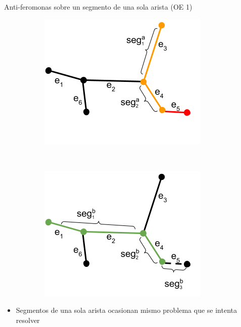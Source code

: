 \begin{frame}{Anti-feromonas sobre un segmento de una sola arista (OE 1)}
\centering
\begin{figure}
  \begin{subfigure}[t]{0.48\textwidth}
    \includegraphics[scale=0.5]{Pictures/ant_segments_complex_case_B2.png}
  \end{subfigure}%
    ~ \hspace{0.1cm}
    \begin{subfigure}[t]{0.48\textwidth}
    \includegraphics[scale=0.5]{Pictures/ant_segments_complex_case_B_blocked.png}
    \end{subfigure}
\end{figure}
\begin{itemize}
    \item Segmentos de una sola arista ocasionan mismo problema que se intenta resolver
\end{itemize}
\end{frame}

